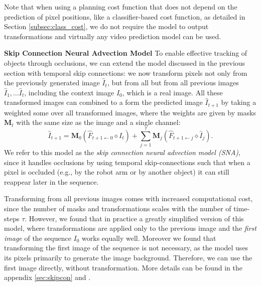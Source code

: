 Note that when using a planning cost function that does not depend on the prediction of pixel positions, like a classifier-based cost function, as detailed in Section \ref{subsec:class_cost}, we do not require the model to output transformations and virtually any video prediction model can be used. 

\noindent \textbf{Skip Connection Neural Advection Model}
To enable effective tracking of objects through occlusions, we can extend the model discussed in the previous section with temporal skip connections: we now transform pixels not only from the previously generated image $\hat{I}_t$, but from all but from all previous images $\hat{I}_1,...\hat{I}_{t}$, including the context image $I_0$, which is a real image. All these transformed images can combined to a form the predicted image $\hat{I}_{t+1}$ by taking a weighted some over all transformed images, where the weights are given by masks $\mathbf{M}_t$ with the same size as the image and a single channel:
\begin{equation}
\hat{I}_{t+1} =  \mathbf{M}_{0} (\hat{F}_{t+1 \leftarrow 0} \diamond I_t) +  \sum_{j=1}^{\tau} \mathbf{M}_{j} (\hat{F}_{t+1 \leftarrow j} \diamond  \hat{I}_j).
\end{equation}
We refer to this model as the \emph{skip connection neural advection model (SNA)}, since it handles occlusions by using temporal skip-connections such that when a pixel is occluded (e.g., by the robot arm or by another object) it can still reappear later in the sequence.

Transforming from all previous images comes with increased computational cost, since the number of masks and transformations scales with the number of time-steps $\tau$. However, we found that in practice a greatly simplified version of this model, where transformations are applied only to the previous image and the \emph{first image} of the sequence $I_0$ works equally well. Moreover we found that transforming the first image of the sequence is not necessary, as the model uses its pixels primarily to generate the image background. Therefore, we can use the first image directly, without transformation. More details can be found in the appendix \ref{sec:skipcon} and \cite{sna}.